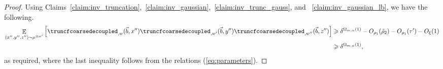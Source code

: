 \documentclass[11pt]{article}
\newcommand\Expect[2]{{\mathop{\mathbb{E}}_{#1}\left[ {#2} \right]}}
\renewcommand\geq{\geqslant}
\newcommand{\V}[1]{{#1}}
\begin{document}
\begin{proof}
   
   
   Using Claims~\ref{claim:inv_truncation},~\ref{claim:inv_gaussian},~\ref{claim:inv_trunc_gauss}, and ~\ref{claim:inv_gaussian_lb}, we have the following.
   \begin{align*}
   \Expect{(\V x'', \V y'', \V z'')\sim\mu^{\otimes n'}}{\truncfcoarsedecoupled_{,\V w}(\vec{b}, \V x'')\truncfcoarsedecoupled_{,\V w'}(\vec{b}, \V y'') \truncfcoarsedecoupled_{,\V w''}(\vec{b}, \V z'')}&\geq \delta^{\Omega_{m,\alpha}(1)}- O_{\rho_1}(\tilde{\rho}_2) - O_{\rho_1}(\tau') -O_{\xi}(1)\\
   &\geq \delta^{\Omega_{m,\alpha}(1)},
   \end{align*}
   as required, where the last inequality follows from the relations (\ref{eq:parameters}).
\end{proof}
\end{document}
